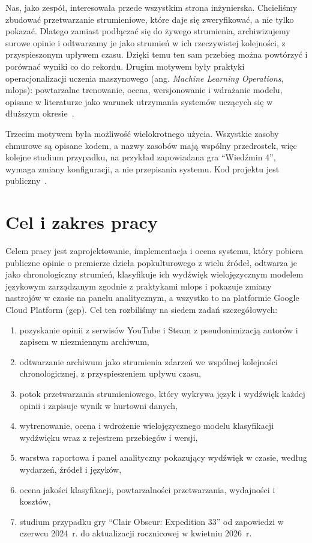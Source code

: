 Nas, jako zespół, interesowała przede wszystkim strona inżynierska.
Chcieliśmy zbudować przetwarzanie strumieniowe, które daje się zweryfikować, a nie tylko pokazać.
Dlatego zamiast podłączać się do żywego strumienia, archiwizujemy surowe opinie i odtwarzamy je jako strumień w ich rzeczywistej kolejności, z przyspieszonym upływem czasu.
Dzięki temu ten sam przebieg można powtórzyć i porównać wyniki co do rekordu.
Drugim motywem były praktyki operacjonalizacji uczenia maszynowego (ang. \textit{Machine Learning Operations}, \ac{mlops}): powtarzalne trenowanie, ocena, wersjonowanie i wdrażanie modelu, opisane w literaturze jako warunek utrzymania systemów uczących się w dłuższym okresie~\cite{sculley2015hidden,kreuzberger2023machine}.

Trzecim motywem była możliwość wielokrotnego użycia.
Wszystkie zasoby chmurowe są opisane kodem, a nazwy zasobów mają wspólny przedrostek, więc kolejne studium przypadku, na przykład zapowiadana gra \enquote{Wiedźmin 4}, wymaga zmiany konfiguracji, a nie przepisania systemu.
Kod projektu jest publiczny~\cite{popvibecheck}.

\section{Cel i zakres pracy}
\label{sec:intro-goal}

Celem pracy jest zaprojektowanie, implementacja i ocena systemu, który pobiera publiczne opinie o premierze dzieła popkulturowego z wielu źródeł, odtwarza je jako chronologiczny strumień, klasyfikuje ich wydźwięk wielojęzycznym modelem językowym zarządzanym zgodnie z praktykami \ac{mlops} i pokazuje zmiany nastrojów w czasie na panelu analitycznym, a wszystko to na platformie Google Cloud Platform (\ac{gcp}).
Cel ten rozbiliśmy na siedem zadań szczegółowych:
\begin{enumerate}
  \item pozyskanie opinii z serwisów YouTube i Steam z pseudonimizacją autorów i zapisem w niezmiennym archiwum,
  \item odtwarzanie archiwum jako strumienia zdarzeń we wspólnej kolejności chronologicznej, z przyspieszeniem upływu czasu,
  \item potok przetwarzania strumieniowego, który wykrywa język i wydźwięk każdej opinii i zapisuje wynik w hurtowni danych,
  \item wytrenowanie, ocena i wdrożenie wielojęzycznego modelu klasyfikacji wydźwięku wraz z rejestrem przebiegów i wersji,
  \item warstwa raportowa i panel analityczny pokazujący wydźwięk w czasie, według wydarzeń, źródeł i języków,
  \item ocena jakości klasyfikacji, powtarzalności przetwarzania, wydajności i kosztów,
  \item studium przypadku gry \enquote{Clair Obscur: Expedition 33} od zapowiedzi w czerwcu 2024~r. do aktualizacji rocznicowej w kwietniu 2026~r.
\end{enumerate}

